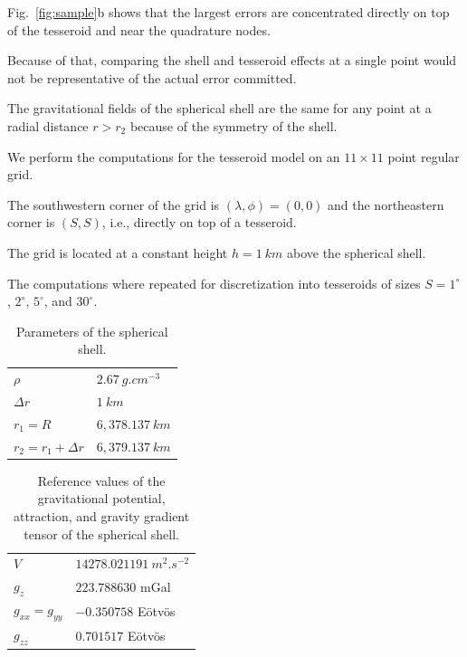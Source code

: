 Fig.~\ref{fig:sample}b shows that the largest errors are concentrated directly
on top of the tesseroid and near the quadrature nodes.

Because of that, comparing the shell and tesseroid effects at a single point
would not be representative of the actual error committed.

The gravitational fields of the spherical shell are the same for any point at a
radial distance $r>r_2$ because of the symmetry of the shell.

We perform the computations for the tesseroid model on an $11 \times 11$ point regular grid.

The southwestern corner of the grid is $(\lambda, \phi) = (0, 0)$
and the northeastern corner is $(S, S)$, i.e., directly on top of a tesseroid.

The grid is located at a constant height $h = 1\ km$ above the spherical shell.


The computations where repeated for discretization into tesseroids of sizes $S = 1^\circ$, $2^\circ$,
$5^\circ$, and $30^\circ$.






\begin{table}
    \caption{Parameters of the spherical shell.}
    \label{tab:shell}
    \begin{tabular}{ll}
        $\rho$                    & $2.67\ g.cm^{-3}$ \\
        $\Delta r$                & $1\ km$\\
        $r_1 = R$                 & $6,378.137\ km$ \\
        $r_2 = r_1 + \Delta r$    & $6,379.137\ km$ \\
    \end{tabular}
\end{table}


\begin{table}
    \caption{Reference values of the gravitational potential, attraction, and
    gravity gradient tensor of the spherical shell.}
    \label{tab:shell-data}
    \begin{tabular}{ll}
        $V$                    &    $14278.021191\ m^2.s^{-2}$ \\
        $g_z$                  &    $223.788630$ mGal \\
        $g_{xx} = g_{yy}$      &    $-0.350758$ E\"otv\"os\\
        $g_{zz}$               &    $0.701517$ E\"otv\"os\\
    \end{tabular}
\end{table}


